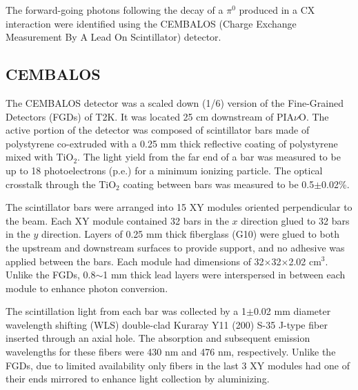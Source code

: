 The forward-going photons following the decay of a $\pi^0$ produced in a CX interaction were identified using the CEMBALOS (Charge Exchange Measurement By A Lead On Scintillator) detector.

\subsection{CEMBALOS}
The CEMBALOS detector was a scaled down (1/6) version of the Fine-Grained Detectors (FGDs) \cite{fgd} of T2K. It was located 25 cm downstream of PIA$\nu$O. The active portion of the detector was composed of scintillator bars made of polystyrene co-extruded with a 0.25 mm thick reflective coating of polystyrene mixed with TiO$_2$. The light yield from the far end of a bar was measured to be up to 18 photoelectrons (p.e.) for a minimum ionizing particle. The optical crosstalk through the TiO$_2$ coating between bars was measured to be 0.5$\pm$0.02\%. 

The scintillator bars were arranged into 15 XY modules oriented perpendicular to the beam. Each XY module contained 32 bars in the $x$ direction glued to 32 bars in the $y$ direction. Layers of 0.25 mm thick fiberglass (G10) were glued to both the upstream and downstream surfaces to provide support, and no adhesive was applied between the bars. Each module had dimensions of 32$\times$32$\times$2.02 cm$^3$. Unlike the FGDs, 0.8$\sim$1 mm thick lead layers were interspersed in between each module to enhance photon conversion. 


The scintillation light from each bar was collected by a 1$\pm$0.02 mm diameter wavelength shifting (WLS) double-clad Kuraray Y11 (200) S-35 J-type fiber inserted through an axial hole. The absorption and subsequent emission wavelengths for these fibers were 430 nm and 476 nm, respectively. Unlike the FGDs, due to limited availability only fibers in the last 3 XY modules had one of their ends mirrored to enhance light collection by aluminizing.

